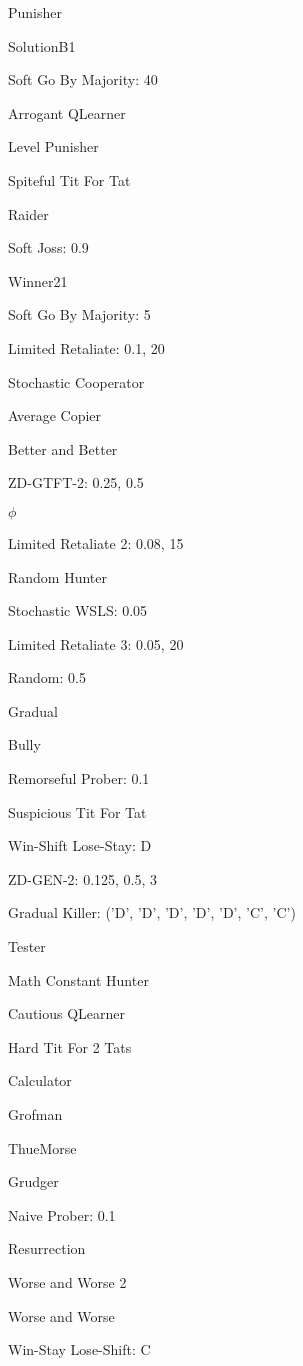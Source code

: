 \item Punisher
\item SolutionB1
\item Soft Go By Majority: 40
\item Arrogant QLearner
\item Level Punisher
\item Spiteful Tit For Tat
\item Raider
\item Soft Joss: 0.9
\item Winner21
\item Soft Go By Majority: 5
\item Limited Retaliate: 0.1, 20
\item Stochastic Cooperator
\item Average Copier
\item Better and Better
\item ZD-GTFT-2: 0.25, 0.5
\item $\phi$
\item Limited Retaliate 2: 0.08, 15
\item Random Hunter
\item Stochastic WSLS: 0.05
\item Limited Retaliate 3: 0.05, 20
\item Random: 0.5
\item Gradual
\item Bully
\item Remorseful Prober: 0.1
\item Suspicious Tit For Tat
\item Win-Shift Lose-Stay: D
\item ZD-GEN-2: 0.125, 0.5, 3
\item Gradual Killer: ('D', 'D', 'D', 'D', 'D', 'C', 'C')
\item Tester
\item Math Constant Hunter
\item Cautious QLearner
\item Hard Tit For 2 Tats
\item Calculator
\item Grofman
\item ThueMorse
\item Grudger
\item Naive Prober: 0.1
\item Resurrection
\item Worse and Worse 2
\item Worse and Worse
\item Win-Stay Lose-Shift: C
